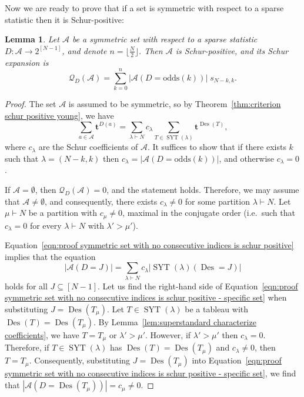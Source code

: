 \documentclass[11pt]{article}
\newtheorem{lemma}[theo]{Lemma}
\theoremstyle{definition}
\providecommand{\ie}{i.e.\ }
\numberwithin{equation}{section}
\newcommand{\Des}{\operatorname{Des}}
\newcommand{\Syt}{\operatorname{SYT}}
\newcommand{\Q}{\mathcal{Q}}
\newcommand{\A}{\mathcal{A}}
\newcommand{\odds}{\mathrm{odds}}
\begin{document}
Now we are ready to prove that if a set is symmetric with respect to a sparse statistic then it is Schur-positive:
\begin{lemma}
\label{lem:if two rows and symmetric then schur positive}
    Let $\A$ be a symmetric set with respect to a sparse statistic $D:\A \to 2^{[N-1]}$, and denote $n = \lfloor\frac{N}{2} \rfloor$. Then $\A$ is Schur-positive, and its Schur expansion is
    \[
        \Q_{D} (\A) = \sum_{k=0}^n |\A(D = \odds(k))|\; s_{N-k,k}.
    \]
\end{lemma}
\begin{proof}
    The set $\A$ is assumed to be symmetric, so by Theorem~\ref{thm:criterion schur positive young}, we have
    \begin{equation}\label{eqn:proof symmetric set with no consecutive indices is schur positive}
        \sum_{a \in \A} \boldsymbol{t}^{D(a)} = \sum_{\lambda \vdash N} c_\lambda \sum_{T \in \Syt(\lambda)} \boldsymbol{t}^{\Des(T)},
    \end{equation}
    where $c_\lambda$ are the Schur coefficients of $\A$. It suffices to show that if there exists $k$ such that $\lambda=(N-k,k)$ then $c_\lambda = |\A(D = \odds(k))|$, and otherwise $c_\lambda=0$.

    If $\A = \emptyset$, then $\Q_{D}(\A) = 0$, and the statement holds. Therefore, we may assume that $\A \ne \emptyset$, and consequently, there exists $c_\lambda \ne 0$ for some partition $\lambda \vdash N$. Let $\mu \vdash N$ be a partition with $c_\mu \ne 0$, maximal in the conjugate order (\ie such that $c_\lambda = 0$ for every $\lambda \vdash N$ with $\lambda' > \mu'$).
    
    Equation~\eqref{eqn:proof symmetric set with no consecutive indices is schur positive} implies that the equation
    \begin{equation}\label{eqn:proof symmetric set with no consecutive indices is schur positive - specific set}
        |\A(D = J)| = \sum_{\lambda \vdash N} c_\lambda \left|\Syt(\lambda)(\Des = J)\right|
    \end{equation}
    holds for all $J \subseteq [N-1]$. Let us find the right-hand side of Equation~\eqref{eqn:proof symmetric set with no consecutive indices is schur positive - specific set} when substituting $J = \Des(T_\mu)$. Let $T \in \Syt(\lambda)$ be a tableau with $\Des(T) = \Des(T_\mu)$. By Lemma~\ref{lem:superstandard characterize coefficients}, we have $T = T_\mu$ or $\lambda' > \mu'$. However, if $\lambda' > \mu'$ then $c_\lambda = 0$. Therefore, if $T \in \Syt(\lambda)$ has $\Des(T) = \Des(T_\mu)$ and $c_\lambda \ne 0$, then $T = T_\mu$. Consequently, substituting $J = \Des(T_\mu)$ into Equation~\eqref{eqn:proof symmetric set with no consecutive indices is schur positive - specific set}, we find that $|\A(D = \Des(T_\mu))| = c_\mu \neq 0$.


\end{proof}
\end{document}
